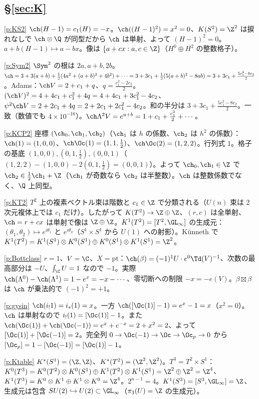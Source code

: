 \subsection*{\S\ref{sec:K}}
\begin{sol}{\ref{p:KS2}}
$\ch(H-1)=c_1(H)=-x$。$\ch((H-1)^2)=x^2=0$、$K(S^2)=\Z^2$ は捩れなしで $\ch\otimes\Q$ が同型だから $\ch$ は単射、よって $(H-1)^2=0$。$a+b(H-1)\mapsto a-bx$。像は $\{a+cx:a,c\in\Z\}$（$H^0\oplus H^2$ の整数格子）。
\end{sol}
\begin{sol}{\ref{p:Sym2}}
$\Sym^2$ の根は $2a,a+b,2b$。$\ch=3+3(a+b)+\frac12(4a^2+(a+b)^2+4b^2)+\cdots=3+3c_1+\frac12(5(a+b)^2-8ab)=3+3c_1+\frac{5c_1^2-8c_2}2$。Adams：$\ch V=2+c_1+q$、$q=\frac{c_1^2-2c_2}2$。$(\ch V)^2=4+4c_1+c_1^2+4q=4+4c_1+3c_1^2-4c_2$、$\psi^2\ch V=2+2c_1+4q=2+2c_1+2c_1^2-4c_2$。和の半分は $3+3c_1+\frac{5c_1^2-8c_2}2$。一致（数値でも $4\times10^{-16}$）。$\ch\Lambda^2V=e^{a+b}=1+c_1+\frac{c_1^2}2+\cdots$。
\end{sol}
\begin{sol}{\ref{p:KCP2}}
座標 $(\ch_0,\ch_1,\ch_2)$（$\ch_1$ は $h$ の係数、$\ch_2$ は $h^2$ の係数）：$\ch(1)=(1,0,0)$、$\ch\Oc(1)=(1,1,\frac12)$、$\ch\Oc(2)=(1,2,2)$。行列式 $1$。格子の基底 $(1,0,0),(0,1,\frac12),(0,0,1)$（$(1,2,2)-(1,0,0)-2(0,1,\frac12)=(0,0,1)$）。よって $\ch_0,\ch_1\in\Z$ で $\ch_2\in\frac12\ch_1+\Z$（$\ch_1$ が奇数なら $\ch_2$ は半整数）。$\ch$ は整数係数でなく、$\Q$ 上同型。
\end{sol}
\begin{sol}{\ref{p:KT2}}
$T^2$ 上の複素ベクトル束は階数と $c_1\in\Z$ で分類される（$U(n)$ 束は 2 次元複体上では $c_1$ だけ）。したがって $K(T^2)\to\Z\oplus\Z$、$(r,c)$ は全単射、$\ch=r+cx$ は単射で像は $\Z\oplus\Z$。$K^1(T^2)=[T^2,\GL_\infty]$ の生成元：$(\theta_1,\theta_2)\mapsto e^{i\theta_1}$ と $e^{i\theta_2}$（$S^1\times S^1$ から $U(1)$ への射影）。Künneth で $K^1(T^2)=K^1(S^1)\otimes K^0(S^1)\oplus K^0(S^1)\otimes K^1(S^1)=\Z^2$。
\end{sol}
\begin{sol}{\ref{p:Bottclass}}
$r=1$、$V=\C$、$X=\mathrm{pt}$：$\ch(\beta)=(-1)^1U\cdot e^0\Td(V)^{-1}$、次数の最高部分は $-U$、$\int_{\C}U=1$ なので $-1$。実際 $\ch(\Lambda^0)-\ch(\Lambda^1)=1-e^x=-x-\cdots$、零切断への制限 $-x=-e(V)$。$\beta\boxtimes\beta$ は $\ch$ が乗法的で $(-1)^2=+1$。
\end{sol}
\begin{sol}{\ref{p:gysin}}
$\ch(i_!1)=i_*(1)=x$。一方 $\ch([\Oc(1)]-1)=e^x-1=x$（$x^2=0$）。$\ch$ は単射なので $i_!(1)=[\Oc(1)]-1$。また $\ch(\Oc(1))+\ch(\Oc(-1))=e^x+e^{-x}=2+x^2=2$、よって $[\Oc(1)]+[\Oc(-1)]=2$。完全列 $0\to\Oc(-1)\to\Oc\to\Oc_p\to0$ から $[\Oc_p]=1-[\Oc(-1)]=[\Oc(1)]-1$。
\end{sol}
\begin{sol}{\ref{p:Ktable}}
$K^*(S^1)=(\Z,\Z)$、$K^*(T^2)=(\Z^2,\Z^2)$。$T^3=T^2\times S^1$：$K^0(T^3)=K^0(T^2)\otimes K^0(S^1)\oplus K^1(T^2)\otimes K^1(S^1)=\Z^2\oplus\Z^2=\Z^4$、$K^1(T^3)=K^0\otimes K^1\oplus K^1\otimes K^0=\Z^4$。$2^{n-1}=4$。$K^1(S^3)=[S^3,\GL_\infty]=\Z$、生成元は包含 $SU(2)\hookrightarrow U(2)\subset\GL_\infty$（$\pi_3(U)=\Z$ の生成元）。
\end{sol}
